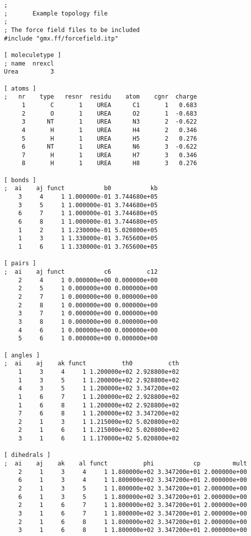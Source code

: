 {\small
\begin{verbatim}
;
;       Example topology file
;
; The force field files to be included
#include "gmx.ff/forcefield.itp"

[ moleculetype ]
; name  nrexcl
Urea         3

[ atoms ]
;   nr    type   resnr  residu    atom    cgnr  charge
     1       C       1    UREA      C1       1   0.683
     2       O       1    UREA      O2       1  -0.683
     3      NT       1    UREA      N3       2  -0.622
     4       H       1    UREA      H4       2   0.346
     5       H       1    UREA      H5       2   0.276
     6      NT       1    UREA      N6       3  -0.622
     7       H       1    UREA      H7       3   0.346
     8       H       1    UREA      H8       3   0.276

[ bonds ]
;  ai    aj funct           b0           kb
    3     4     1 1.000000e-01 3.744680e+05 
    3     5     1 1.000000e-01 3.744680e+05 
    6     7     1 1.000000e-01 3.744680e+05 
    6     8     1 1.000000e-01 3.744680e+05 
    1     2     1 1.230000e-01 5.020800e+05 
    1     3     1 1.330000e-01 3.765600e+05 
    1     6     1 1.330000e-01 3.765600e+05 

[ pairs ]
;  ai    aj funct           c6          c12
    2     4     1 0.000000e+00 0.000000e+00 
    2     5     1 0.000000e+00 0.000000e+00 
    2     7     1 0.000000e+00 0.000000e+00 
    2     8     1 0.000000e+00 0.000000e+00 
    3     7     1 0.000000e+00 0.000000e+00 
    3     8     1 0.000000e+00 0.000000e+00 
    4     6     1 0.000000e+00 0.000000e+00 
    5     6     1 0.000000e+00 0.000000e+00 

[ angles ]
;  ai    aj    ak funct          th0          cth
    1     3     4     1 1.200000e+02 2.928800e+02 
    1     3     5     1 1.200000e+02 2.928800e+02 
    4     3     5     1 1.200000e+02 3.347200e+02 
    1     6     7     1 1.200000e+02 2.928800e+02 
    1     6     8     1 1.200000e+02 2.928800e+02 
    7     6     8     1 1.200000e+02 3.347200e+02 
    2     1     3     1 1.215000e+02 5.020800e+02 
    2     1     6     1 1.215000e+02 5.020800e+02 
    3     1     6     1 1.170000e+02 5.020800e+02 

[ dihedrals ]
;  ai    aj    ak    al funct          phi           cp         mult
    2     1     3     4     1 1.800000e+02 3.347200e+01 2.000000e+00 
    6     1     3     4     1 1.800000e+02 3.347200e+01 2.000000e+00 
    2     1     3     5     1 1.800000e+02 3.347200e+01 2.000000e+00 
    6     1     3     5     1 1.800000e+02 3.347200e+01 2.000000e+00 
    2     1     6     7     1 1.800000e+02 3.347200e+01 2.000000e+00 
    3     1     6     7     1 1.800000e+02 3.347200e+01 2.000000e+00 
    2     1     6     8     1 1.800000e+02 3.347200e+01 2.000000e+00 
    3     1     6     8     1 1.800000e+02 3.347200e+01 2.000000e+00 


\end{verbatim}}

